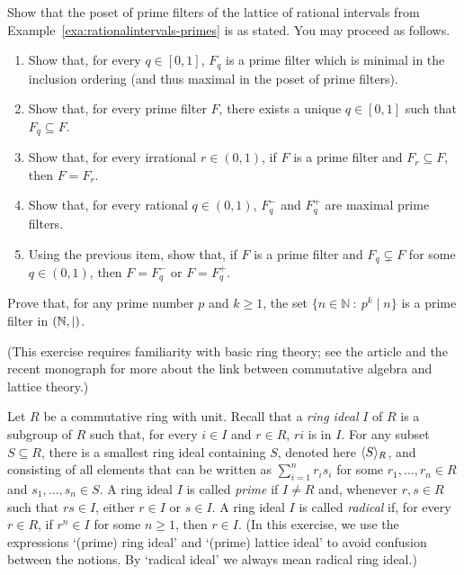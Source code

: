   \exercise \label{exe:rationalintervals}
    Show that the poset of prime filters of the lattice of rational intervals from Example~\ref{exa:rationalintervals-primes} is as stated. You may proceed as follows.
    \begin{enumerate}
      \item Show that, for every $q \in [0,1]$, $F_q$ is a prime filter which is minimal in the inclusion ordering (and thus maximal in the poset of prime filters).
      \item Show that, for every prime filter $F$, there exists a unique $q \in [0,1]$ such that $F_q \subseteq F$. 
      \item Show that, for every irrational $r \in (0,1)$, if $F$ is a prime filter and $F_r \subseteq F$, then $F = F_r$.
      \item Show that, for every rational $q \in (0,1)$, $F_q^-$ and $F_q^+$ are maximal prime filters.
      \item Using the previous item, show that, if $F$ is a prime filter and $F_q \subsetneq F$ for some $q \in (0,1)$, then $F = F_q^-$ or $F = F_q^+$.
    \end{enumerate}

  \exercise \label{exe:prime-divisibility}
  Prove that, for any prime number $p$ and $k\geq 1$, the set $\{ n \in \mathbb{N} \ : \ p^k \mid n\}$ is a prime filter in $(\mathbb{N}, |)$.

  \exercise \label{exe:primes-ring} (This exercise requires familiarity with basic ring theory; see the article \cite{Ban96} and the recent monograph \cite{DicSchTre2019} for more about the link between commutative algebra and lattice theory.)

  Let $R$ be a commutative ring with unit. Recall that a \emph{ring ideal} $I$ of $R$ is a subgroup of $R$ such that, for every $i \in I$ and $r \in R$, $ri$ is in $I$. For any subset $S \subseteq R$, there is a smallest ring ideal containing $S$, denoted here $\langle S \rangle_R$, and consisting of all elements that can be written as $\sum_{i=1}^n r_i s_i$ for some $r_1, \dots, r_n \in R$ and $s_1,\dots,s_n \in S$. A ring ideal $I$ is called \emph{prime} if $I \neq R$ and, whenever $r, s \in R$ such that $rs \in I$, either $r \in I$ or $s \in I$. A ring ideal $I$ is called \emph{radical} if, for every $r \in R$, if $r^n \in I$ for some $n \geq 1$, then $r \in I$. (In this exercise, we use the expressions `(prime) ring ideal' and `(prime) lattice ideal' to avoid confusion between the notions. By `radical ideal' we always mean radical ring ideal.) 
  
